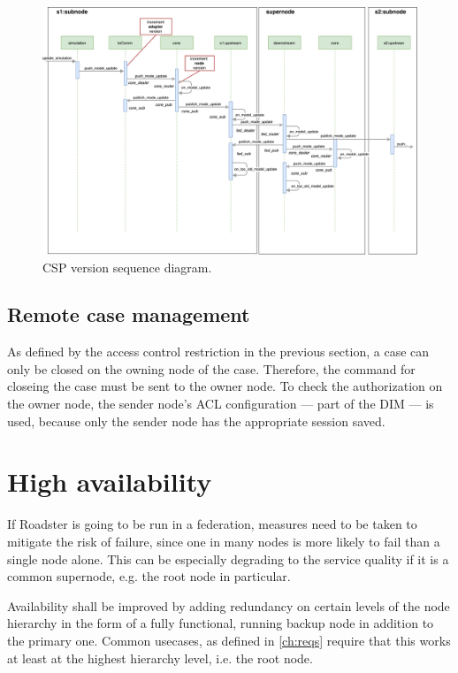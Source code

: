 \begin{figure}[]
	\includegraphics[width=\textwidth]{img/sequence_diagram_model_update_pub.pdf}
	\caption{CSP version sequence diagram.}
	\label{fig:csp:version-sequence}
\end{figure}




\subsection{Remote case management}
As defined by the access control restriction in the previous section, a case
can only be closed on the owning node of the case. Therefore, the command
for closeing the case must be sent to the owner node. To check the authorization
on the owner node, the sender node's ACL configuration --- part of the DIM --- is used, because only
the sender node has the appropriate session saved.


\clearpage
\section{High availability}\label{sec:approach:ha}
If Roadster is going to be run in a federation, measures need to be taken to
mitigate the risk of failure, since one in many nodes is more likely to fail than a
single node alone. This can be especially degrading to the service quality if
it is a common supernode, e.g. the root node in particular.

Availability shall be improved by adding redundancy on certain levels of the
node hierarchy in the form of a fully functional, running backup node in
addition to the primary one. Common usecases, as defined in \autoref{ch:reqs}
require that this works at least at the highest hierarchy level, i.e. the root
node.

